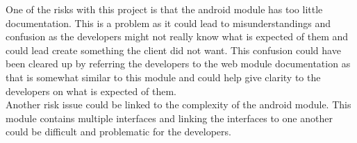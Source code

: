 One of the risks with this project is that the android module has too little documentation. This is a problem as it could lead to misunderstandings and confusion as the developers might not really know what is expected of them and could lead create something the client did not want. This confusion could have been cleared up by referring the developers to the web module documentation as that is somewhat similar to this module and could help give clarity to the developers on what is expected of them. \\
Another risk issue could be linked to the complexity of the android module. This module contains multiple interfaces and linking the interfaces to one another could be difficult and problematic for the developers.

